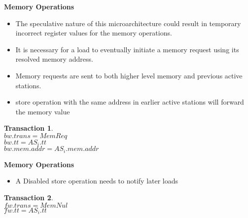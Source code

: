 \documentclass[12pt]{slides}
\newtheorem{trans}{Transaction}
\begin{document}
\begin{slide}
\begin{center}
\textbf {Memory Operations}
\end{center}
%
\begin{itemize}
%
\item 
The speculative nature of this microarchitecture could result in temporary incorrect
register values for the memory operations.
%
\item
It is necessary for a load to eventually
initiate a memory request using its resolved memory address.  
%
\item
Memory requests are sent
to both higher level memory and previous active stations.
%
\item
store operation with the same address in earlier
active stations will forward the memory value
%
\end{itemize}


\begin{trans}
\mbox{} \\
\indent $bw.trans = MemReq$ \\
\indent $bw.tt = AS_i.tt$ \\
\indent $bw.mem.addr = AS_i.mem.addr $
\end{trans}

\end{slide}



\begin{slide}
\begin{center}
\textbf {Memory Operations}
\end{center}
%
\begin{itemize}
%
\item 
A Disabled store operation needs to notify later loads
%
%
\end{itemize}

\begin{trans}
\mbox{} \\
\indent $fw.trans = MemNul$ \\
\indent $fw.tt = AS_i.tt$ \\
\end{trans}

\end{slide}
\end{document}

